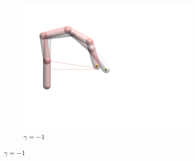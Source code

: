 \begin{figure}[h]
\begin{subfigure}[b]{.3\textwidth}
        \includegraphics[width=\textwidth]{Figures/distortions/distortions-1.png}
        \caption{$\gamma = -1$}
    \end{subfigure}
    

\end{figure}
